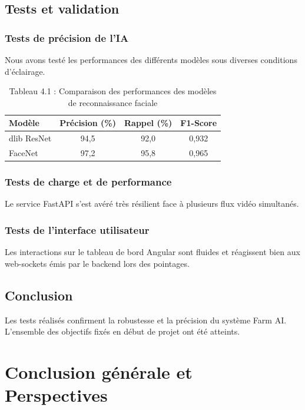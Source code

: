 \documentclass[12pt,a4paper]{report}
\begin{document}
\section{Tests et validation}

\subsection{Tests de précision de l'IA}
Nous avons testé les performances des différents modèles sous diverses conditions d'éclairage.

\begin{table}[h]
  \centering
  \begin{tabular}{lccc}
    \toprule
    \textbf{Modèle} & \textbf{Précision (\%)} & \textbf{Rappel (\%)} & \textbf{F1-Score} \\
    \midrule
    dlib ResNet & 94,5 & 92,0 & 0,932 \\
    FaceNet     & 97,2 & 95,8 & 0,965 \\
    \bottomrule
  \end{tabular}
  \caption{Tableau 4.1 : Comparaison des performances des modèles de reconnaissance faciale}
  \label{tab:perf}
\end{table}

\subsection{Tests de charge et de performance}
Le service FastAPI s'est avéré très résilient face à plusieurs flux vidéo simultanés.

\subsection{Tests de l'interface utilisateur}
Les interactions sur le tableau de bord Angular sont fluides et réagissent bien aux web-sockets émis par le backend lors des pointages.

\section{Conclusion}
Les tests réalisés confirment la robustesse et la précision du système Farm AI. L'ensemble des
objectifs fixés en début de projet ont été atteints.

\chapter*{Conclusion générale et Perspectives}
\end{document}
